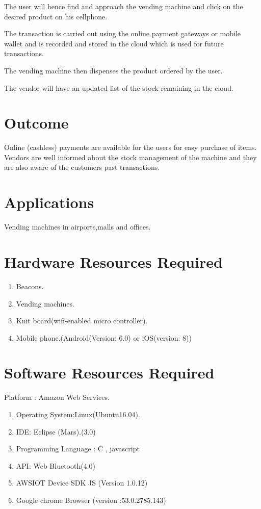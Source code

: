 \documentclass[oneside,a4paper,12pt]{report}
\begin{document}
The user will hence find and approach the vending machine and click on the desired product on his cellphone.

 The transaction is carried out using the online payment gateways or mobile wallet and is recorded and stored in the cloud which is used for future transactions.

 The vending machine then dispenses the product ordered by the user.

The vendor will have an updated list of the stock remaining in the cloud.

\section{Outcome}

 Online (cashless) payments are available for the users for easy purchase of items.
Vendors are well informed about the stock management of the machine and they are also aware of the customers past transactions.

\section{Applications}

Vending machines in airports,malls and offices.

\section{Hardware Resources Required}
\begin{enumerate}
\item Beacons.
\item Vending machines.
\item Knit board(wifi-enabled micro controller).
\item Mobile phone.(Android(Version: 6.0) or iOS(version: 8))
\end{enumerate}


\section{Software Resources Required}
Platform : Amazon Web Services.
\begin{enumerate}
\item Operating System:Linux(Ubuntu16.04). 
\item IDE: Eclipse (Mars).(3.0)
\item Programming Language : C , javascript
\item API: Web Bluetooth(4.0)
\item AWSIOT Device SDK JS (Version 1.0.12)
\item Google chrome Browser (version :53.0.2785.143)
\end{enumerate}
\end{document}
